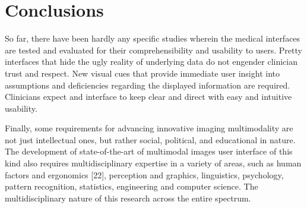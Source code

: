 \section{Conclusions}

So far, there have been hardly any specific studies wherein the medical interfaces are tested and evaluated for their comprehensibility and usability to users. Pretty interfaces that hide the ugly reality of underlying data do not engender clinician trust and respect. New visual cues that provide immediate user insight into assumptions and deficiencies regarding the displayed information are required. Clinicians expect and interface to keep clear and direct with easy and intuitive usability.

Finally, some requirements for advancing innovative imaging multimodality are not just intellectual ones, but rather social, political, and educational in nature. The development of state-of-the-art of multimodal images user interface of this kind also requires multidisciplinary expertise in a variety of areas, such as human factors and ergonomics [22], perception and graphics, linguistics, psychology, pattern recognition, statistics, engineering and computer science. The multidisciplinary nature of this research across the entire spectrum.

\clearpage

